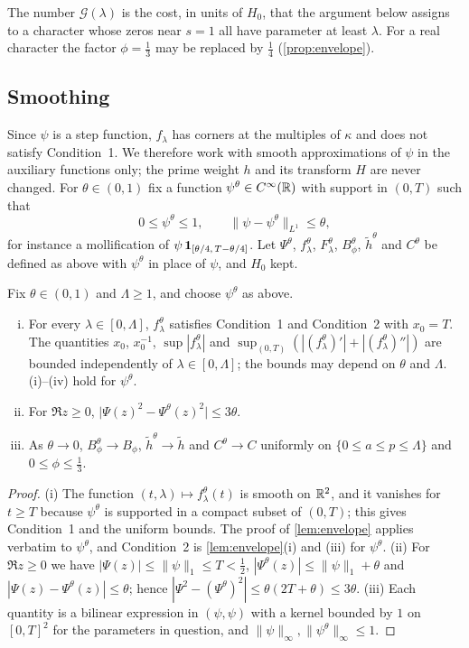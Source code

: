 The number $\mathcal G(\lambda)$ is the cost, in units of $H_0$, that the argument below assigns to a
character whose zeros near $s=1$ all have parameter at least $\lambda$. For a real character
the factor $\phi=\frac13$ may be replaced by $\frac14$ (\cref{prop:envelope}).

\subsection{Smoothing}\label{subsec:smoothing}
Since $\psi$ is a step function, $f_\lambda$ has corners at the multiples of $\kappa$ and does
not satisfy Condition~1. We therefore work with smooth approximations of $\psi$ in the
auxiliary functions only; the prime weight $h$ and its transform $H$ are never changed. For
$\theta\in(0,1)$ fix a function $\psi^\theta\in C^\infty(\mathbb{R})$ with support in $(0,T)$ such that
\[
  0\le\psi^\theta\le1,\qquad\|\psi-\psi^\theta\|_{L^1}\le\theta,
\]
for instance a mollification of $\psi\,\mathbf{1}_{[\theta/4,\,T-\theta/4]}$. Let $\Psi^\theta$,
$f^\theta_\lambda$, $F^\theta_\lambda$, $B^\theta_\phi$, $\tilde h^\theta$ and $C^\theta$ be defined as above
with $\psi^\theta$ in place of $\psi$, and $H_0$ kept.

\begin{lemma}\label{lem:smoothing}
Fix $\theta\in(0,1)$ and $\Lambda\ge1$, and choose $\psi^\theta$ as above.
\begin{enumerate}[(i)]
  \item For every $\lambda\in[0,\Lambda]$, $f^\theta_\lambda$ satisfies Condition~1 and
    Condition~2 with $x_0=T$. The quantities $x_0$, $x_0^{-1}$, $\sup|f^\theta_\lambda|$ and
    $\sup_{(0,T)}(|(f^\theta_\lambda)'|+|(f^\theta_\lambda)''|)$ are bounded independently of
    $\lambda\in[0,\Lambda]$; the bounds may depend on $\theta$ and $\Lambda$.
    (i)--(iv) hold for $\psi^\theta$.
  \item For $\Re z\ge0$, $\bigl|\Psi(z)^2-\Psi^\theta(z)^2\bigr|\le3\theta$.
  \item As $\theta\to0$, $B^\theta_\phi\to B_\phi$, $\tilde h^\theta\to\tilde h$ and $C^\theta\to C$ uniformly on
    $\{0\le a\le p\le\Lambda\}$ and $0\le\phi\le\frac13$.
\end{enumerate}
\end{lemma}

\begin{proof}
(i) The function $(t,\lambda)\mapsto f^\theta_\lambda(t)$ is smooth on $\mathbb{R}^2$, and it vanishes for
$t\ge T$ because $\psi^\theta$ is supported in a compact subset of $(0,T)$; this gives
Condition~1 and the uniform bounds. The proof of \cref{lem:envelope} applies verbatim to
$\psi^\theta$, and Condition~2 is \cref{lem:envelope}(i) and (iii) for $\psi^\theta$.
(ii) For $\Re z\ge0$ we have $|\Psi(z)|\le\|\psi\|_1\le T<\frac12$, $|\Psi^\theta(z)|\le\|\psi\|_1+\theta$
and $|\Psi(z)-\Psi^\theta(z)|\le\theta$; hence $|\Psi^2-(\Psi^\theta)^2|\le\theta(2T+\theta)\le3\theta$.
(iii) Each quantity is a bilinear expression in $(\psi,\psi)$ with a kernel bounded by $1$ on
$[0,T]^2$ for the parameters in question, and $\|\psi\|_\infty,\|\psi^\theta\|_\infty\le1$.
\end{proof}

